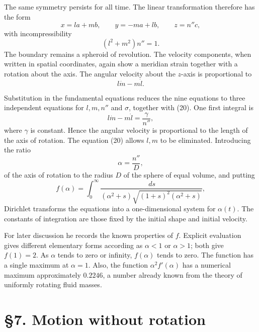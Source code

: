 \documentclass[11pt]{article}
\newcommand{\dd}{\,d}
\begin{document}
The same symmetry persists for all time.  The linear transformation therefore has the form
\begin{equation}
 x=la+mb,
 \qquad y=-ma+lb,
 \qquad z=n''c,
\end{equation}
with incompressibility
\begin{equation}
 (l^2+m^2)n''=1.
\end{equation}
The boundary remains a spheroid of revolution.  The velocity components, when written in spatial coordinates, again show a meridian strain together with a rotation about the axis.  The angular velocity about the \(z\)-axis is proportional to
\[
 l\dot m-m\dot l.
\]

Substitution in the fundamental equations reduces the nine equations to three independent equations for \(l,m,n''\) and \(\sigma\), together with (20).  One first integral is
\begin{equation}
 l\dot m-m\dot l=\frac{\gamma}{n''},
\end{equation}
where \(\gamma\) is constant.  Hence the angular velocity is proportional to the length of the axis of rotation.  The equation (20) allows \(l,m\) to be eliminated.  Introducing the ratio
\begin{equation}
 \alpha=\frac{n''}{D},
\end{equation}
of the axis of rotation to the radius \(D\) of the sphere of equal volume, and putting
\[
 f(\alpha)=\int_0^\infty\frac{\dd s}{(\alpha^2+s)\sqrt{(1+s)^2(\alpha^2+s)}},
\]
Dirichlet transforms the equations into a one-dimensional system for \(\alpha(t)\).  The constants of integration are those fixed by the initial shape and initial velocity.

For later discussion he records the known properties of \(f\).  Explicit evaluation gives different elementary forms according as \(\alpha<1\) or \(\alpha>1\); both give \(f(1)=2\).  As \(\alpha\) tends to zero or infinity, \(f(\alpha)\) tends to zero.  The function has a single maximum at \(\alpha=1\).  Also, the function \(\alpha^2 f'(\alpha)\) has a numerical maximum approximately \(0.2246\), a number already known from the theory of uniformly rotating fluid masses.

\section*{\S7. Motion without rotation}
\end{document}
